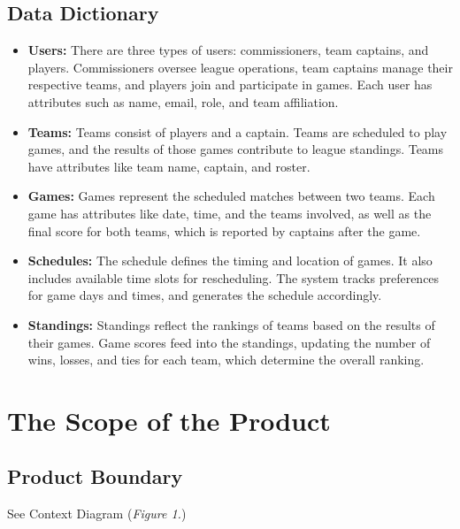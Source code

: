 \documentclass[12pt]{article}
\begin{document}
\subsection{Data Dictionary}
\begin{itemize}
    \item \textbf{Users:} There are three types of users: commissioners, team captains, and players. Commissioners oversee league operations, team captains manage their respective teams, and players join and participate in games. Each user has attributes such as name, email, role, and team affiliation.
    
    \item \textbf{Teams:} Teams consist of players and a captain. Teams are scheduled to play games, and the results of those games contribute to league standings. Teams have attributes like team name, captain, and roster.
    
    \item \textbf{Games:} Games represent the scheduled matches between two teams. Each game has attributes like date, time, and the teams involved, as well as the final score for both teams, which is reported by captains after the game.
    
    \item \textbf{Schedules:} The schedule defines the timing and location of games. It also includes available time slots for rescheduling. The system tracks preferences for game days and times, and generates the schedule accordingly.
    
    \item \textbf{Standings:} Standings reflect the rankings of teams based on the results of their games. Game scores feed into the standings, updating the number of wins, losses, and ties for each team, which determine the overall ranking.
\end{itemize}

\section{The Scope of the Product}
\subsection{Product Boundary}
See Context Diagram (\textit{Figure 1.})
\end{document}
